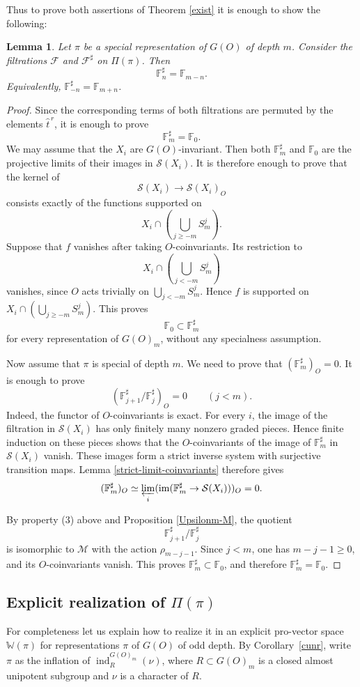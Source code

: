 \documentclass[11pt,a4paper,twoside]{amsart}
\newtheorem{lemma}[theorem]{Lemma}
\theoremstyle{definition}
\theoremstyle{remark}
\newcommand{\mF}{\mathbb F}
\newcommand{\mW}{\mathbb W}
\newcommand{\mcF}{\mathcal F}
\newcommand{\mcM}{\mathcal M}
\newcommand{\mcS}{\mathcal S}
\newcommand{\ind}{\operatorname{ind}}
\begin{document}
Thus to prove both assertions of Theorem \ref{exist} it is enough to show the following:
\begin{lemma}
Let $\pi$ be a special representation of $G(O)$ of depth $m$. Consider the filtrations $\mcF$ and $\mcF^{\sharp}$ on $\Pi(\pi)$.
Then
$$
\mF_n^\sharp=\mF_{m-n}.
$$
Equivalently, $\mF_{-n}^\sharp=\mF_{m+n}$.
\end{lemma}
\begin{proof}
Since the corresponding terms of both filtrations are permuted by the elements $\widehat t^{\,r}$, it is enough to prove
$$
\mF_m^\sharp=\mF_0.
$$
We may assume that the $X_i$ are $G(O)$-invariant. Then both $\mF_m^\sharp$ and $\mF_0$ are the projective limits of their images in $\mcS(X_i)$. It is therefore enough to prove that the kernel of
$$
\mcS(X_i)\longrightarrow\mcS(X_i)_O
$$
consists exactly of the functions supported on
$$
X_i\cap\left(\bigcup_{j\geq-m}S_m^j\right).
$$
Suppose that $f$ vanishes after taking $O$-coinvariants. Its restriction to
$$
X_i\cap\left(\bigcup_{j<-m}S_m^j\right)
$$
vanishes, since $O$ acts trivially on $\bigcup_{j<-m}S_m^j$. Hence $f$ is supported on $X_i\cap(\bigcup_{j\geq-m}S_m^j)$. This proves
$$
\mF_0\subset\mF_m^\sharp
$$
for every representation of $G(O)_m$, without any specialness assumption.

Now assume that $\pi$ is special of depth $m$. We need to prove that $(\mF_m^\sharp)_O=0$. It is enough to prove
$$
\left(\mF_{j+1}^\sharp/\mF_j^\sharp\right)_O=0
\qquad(j<m).
$$
Indeed, the functor of $O$-coinvariants is exact. For every $i$, the image of the filtration in $\mcS(X_i)$ has only finitely many nonzero graded pieces. Hence finite induction on these pieces shows that the $O$-coinvariants of the image of $\mF_m^\sharp$ in $\mcS(X_i)$ vanish. These images form a strict inverse system with surjective transition maps. Lemma \ref{strict-limit-coinvariants} therefore gives
$$
(\mF_m^\sharp)_O\simeq
\varprojlim_i(\operatorname{im}(\mF_m^\sharp\to\mcS(X_i)))_O=0.
$$

By property (3) above and Proposition \ref{Upsilonm-M}, the quotient
$$
\mF_{j+1}^\sharp/\mF_j^\sharp
$$
is isomorphic to $\mcM$ with the action $\rho_{m-j-1}$. Since $j<m$, one has $m-j-1\geq0$, and its $O$-coinvariants vanish. This proves $\mF_m^\sharp\subset\mF_0$, and therefore $\mF_m^\sharp=\mF_0$.

\end{proof}


\subsection{Explicit realization of $\Pi(\pi)$} For completeness let us explain how to realize it in an explicit pro-vector space $\mW(\pi)$ for representations $\pi$ of $G(O)$ of odd depth. By Corollary~\ref{cunr}, write $\pi$ as the inflation of $\ind_R^{G(O)_m}(\nu)$, where $R\subset G(O)_m$ is a closed almost unipotent subgroup and $\nu$ is a character of $R$.
\end{document}
